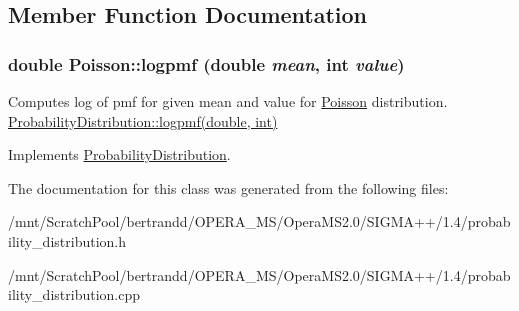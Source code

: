 \subsection{Member Function Documentation}
\hypertarget{classPoisson_acf02dfa9d438104f7d7feb17af5b01d6}{
\subsubsection[{logpmf}]{\setlength{\rightskip}{0pt plus 5cm}double Poisson::logpmf (double {\em mean}, \/  int {\em value})}}
\label{classPoisson_acf02dfa9d438104f7d7feb17af5b01d6}


Computes log of pmf for given mean and value for \hyperlink{classPoisson}{Poisson} distribution.  \hyperlink{classProbabilityDistribution_a63fcfece2a48875e736e6d8d3214c6e3}{ProbabilityDistribution::logpmf(double, int)} 

Implements \hyperlink{classProbabilityDistribution_a63fcfece2a48875e736e6d8d3214c6e3}{ProbabilityDistribution}.

The documentation for this class was generated from the following files:\begin{DoxyCompactItemize}
\item 
/mnt/ScratchPool/bertrandd/OPERA\_\-MS/OperaMS2.0/SIGMA++/1.4/probability\_\-distribution.h\item 
/mnt/ScratchPool/bertrandd/OPERA\_\-MS/OperaMS2.0/SIGMA++/1.4/probability\_\-distribution.cpp\end{DoxyCompactItemize}
